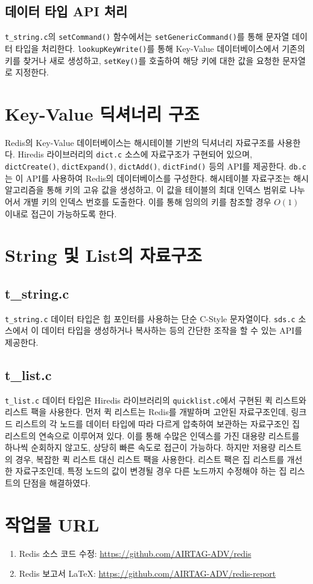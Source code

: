 \documentclass[11pt]{article}
\begin{document}
\subsection{데이터 타입 API 처리}
\texttt{t\_string.c}의 \texttt{setCommand()} 함수에서는
\texttt{setGenericCommand()}를 통해 문자열 데이터 타입을 처리한다.
\texttt{lookupKeyWrite()}를 통해 Key-Value 데이터베이스에서 기존의 키를 찾거나
새로 생성하고, \texttt{setKey()}를 호출하여 해당 키에 대한 값을 요청한 문자열로
지정한다.

\section{Key-Value 딕셔너리 구조}
Redis의 Key-Value 데이터베이스는 해시테이블 기반의 딕셔너리 자료구조를 사용한다.
Hiredis 라이브러리의 \texttt{dict.c} 소스에 자료구조가 구현되어 있으며,
\texttt{dictCreate()}, \texttt{dictExpand()}, \texttt{dictAdd()},
\texttt{dictFind()} 등의 API를 제공한다. \texttt{db.c}는 이 API를 사용하여
Redis의 데이터베이스를 구성한다. 해시테이블 자료구조는 해시 알고리즘을 통해 키의 고유
값을 생성하고, 이 값을 테이블의 최대 인덱스 범위로 나누어서 개별 키의 인덱스 번호를
도출한다. 이를 통해 임의의 키를 참조할 경우 $O(1)$ 이내로 접근이 가능하도록 한다.

\section{String 및 List의 자료구조}

\subsection{t\_string.c}
\texttt{t\_string.c} 데이터 타입은 힙 포인터를 사용하는 단순 C-Style 문자열이다.
\texttt{sds.c} 소스에서 이 데이터 타입을 생성하거나 복사하는 등의 간단한 조작을 할 수
있는 API를 제공한다.

\subsection{t\_list.c}
\texttt{t\_list.c} 데이터 타입은 Hiredis 라이브러리의 \texttt{quicklist.c}에서
구현된 퀵 리스트와 리스트 팩을 사용한다. 먼저 퀵 리스트는 Redis를 개발하며 고안된
자료구조인데, 링크드 리스트의 각 노드를 데이터 타입에 따라 다르게 압축하여 보관하는
자료구조인 집 리스트의 연속으로 이루어져 있다. 이를 통해 수많은 인덱스를 가진 대용량
리스트를 하나씩 순회하지 않고도, 상당히 빠른 속도로 접근이 가능하다. 하지만 저용량
리스트의 경우, 복잡한 퀵 리스트 대신 리스트 팩을 사용한다. 리스트 팩은 집 리스트를
개선한 자료구조인데, 특정 노드의 값이 변경될 경우 다른 노드까지 수정해야 하는
집 리스트의 단점을 해결하였다.

\section{작업물 URL}
\begin{enumerate}
    \item Redis 소스 코드 수정: \url{https://github.com/AIRTAG-ADV/redis}
    \item Redis 보고서 \LaTeX: \url{https://github.com/AIRTAG-ADV/redis-report}
\end{enumerate}
\end{document}
